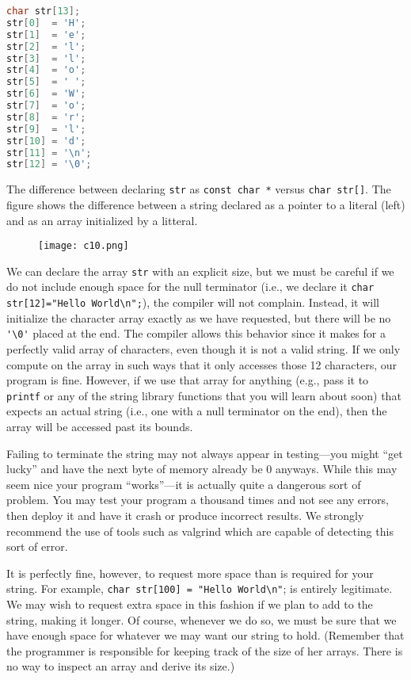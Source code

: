 \documentclass[12pt,a4paper]{article}
\begin{document}
\begin{lstlisting}[language=C]
char str[13];
str[0]  = 'H';
str[1]  = 'e';
str[2]  = 'l';
str[3]  = 'l';
str[4]  = 'o';
str[5]  = ' ';
str[6]  = 'W';
str[7]  = 'o';
str[8]  = 'r';
str[9]  = 'l';
str[10] = 'd';
str[11] = '\n';
str[12] = '\0';
\end{lstlisting}

\noindent
The difference between declaring \verb|str| as
\verb|const char *| versus \verb|char str[]|. The figure shows the difference
between a string declared as a pointer to a literal (left) and as an array
initialized by a litteral.

\begin{figure}[!htbp]
	\centering
	\texttt{[image: c10.png]}
\end{figure}

We can declare the array \verb|str| with an explicit size, but we must be
careful if we do not include enough space for the null terminator (i.e., we
declare it \verb|char str[12]="Hello World\n";|), the compiler will not
complain. Instead, it will initialize the character array exactly as we have
requested, but there will be no \verb|'\0'| placed at the end. The compiler
allows this behavior since it makes for a perfectly valid array of characters,
even though it is not a valid string. If we only compute on the array in such
ways that it only accesses those 12 characters, our program is fine. However,
if we use that array for anything (e.g., pass it to \verb|printf| or any of the
string library functions that you will learn about soon) that expects an actual
string (i.e., one with a null terminator on the end), then the array will be
accessed past its bounds.

Failing to terminate the string may not always appear in testing—you might “get
lucky” and have the next byte of memory already be 0 anyways. While this may
seem nice your program “works”—it is actually quite a dangerous sort of
problem. You may test your program a thousand times and not see any errors,
then deploy it and have it crash or produce incorrect results. We strongly
recommend the use of tools such as valgrind which are capable of detecting this
sort of error.

It is perfectly fine, however, to request more space than is required for your
string. For example, \verb|char str[100] = "Hello World\n"|; is entirely
legitimate. We may wish to request extra space in this fashion if we plan to
add to the string, making it longer. Of course, whenever we do so, we must be
sure that we have enough space for whatever we may want our string to hold.
(Remember that the programmer is responsible for keeping track of the size of
her arrays. There is no way to inspect an array and derive its size.)
\end{document}
